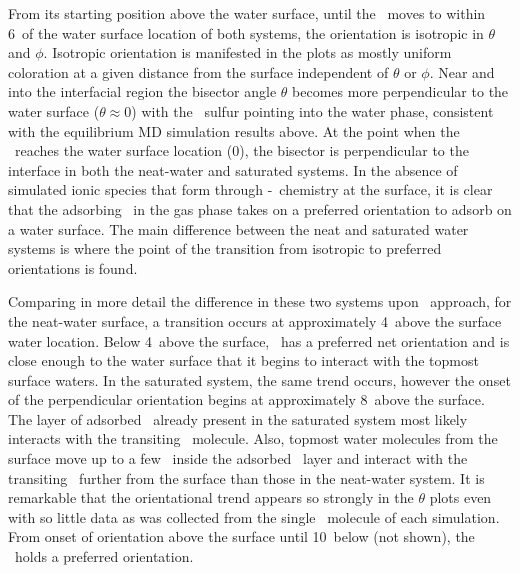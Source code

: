 	From its starting position above the water surface, until the \suldiox~moves to within 6\angs~of the water surface location of both systems, the orientation is isotropic in $\theta$ and $\phi$. Isotropic orientation is manifested in the plots as mostly uniform coloration at a given distance from the surface independent of $\theta$ or $\phi$. Near and into the interfacial region the bisector angle $\theta$ becomes more perpendicular to the water surface ($\theta \approx 0$\textdegree) with the \suldiox~sulfur pointing into the water phase, consistent with the equilibrium MD simulation results above. At the point when the \suldiox~reaches the water surface location (0\angs), the bisector is perpendicular to the interface in both the neat-water and saturated systems. %
	In the absence of simulated ionic species that form through \suldiox-\wat~chemistry at the surface, it is clear that the adsorbing \suldiox~in the gas phase takes on a preferred orientation to adsorb on a water surface. The main difference between the neat and saturated water systems is where the point of the transition from isotropic to preferred orientations is found. 
 
  Comparing in more detail the difference in these two systems upon \suldiox~approach, for the neat-water surface, a transition occurs at approximately 4\angs~above the surface water location. Below 4\angs~above the surface, \suldiox~has a preferred net orientation and is close enough to the water surface that it begins to interact with the topmost surface waters. In the saturated system, the same trend occurs, however the onset of the perpendicular orientation begins at approximately 8\angs~above the surface. The layer of adsorbed \suldiox~already present in the saturated system most likely interacts with the transiting \suldiox~molecule. Also, topmost water molecules from the surface move up to a few \angs~inside the adsorbed \suldiox~layer and interact with the transiting \suldiox~further from the surface than those in the neat-water system. It is remarkable that the orientational trend appears so strongly in the $\theta$ plots even with so little data as was collected from the single \suldiox~molecule of each simulation. From onset of orientation above the surface until 10\angs~below (not shown), the \suldiox~holds a preferred orientation.


